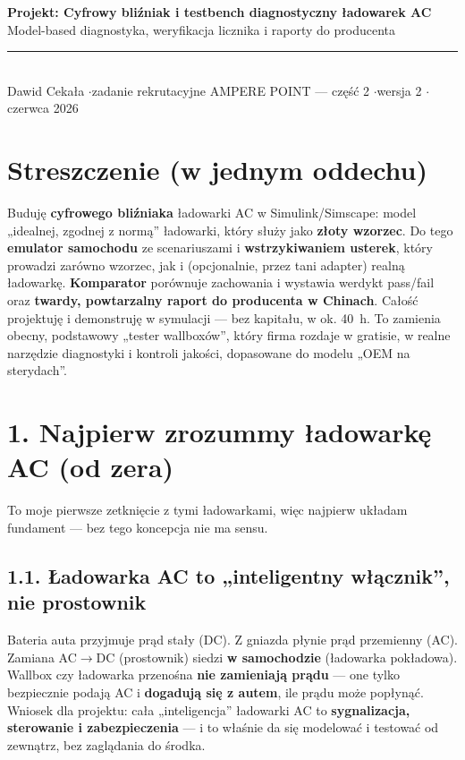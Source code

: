 \documentclass[11pt]{article}
\newcommand{\ra}{$\rightarrow$}
\newcommand{\key}[1]{\textbf{\color{navy}#1}}
\begin{document}
{\sffamily\bfseries\color{navy}\LARGE Projekt: Cyfrowy bliźniak i testbench diagnostyczny ładowarek AC}\\[3pt]
{\sffamily\large\color{navy} Model-based diagnostyka, weryfikacja licznika i raporty do producenta}\\[5pt]
{\color{rulegrey}\rule{\linewidth}{1pt}}\\[3pt]
{\sffamily\small Dawid Cekała \quad$\cdot$\quad zadanie rekrutacyjne AMPERE POINT --- część 2 \quad$\cdot$\quad wersja 2 \quad$\cdot$ czerwca 2026}

\vspace{0.7em}

\section{Streszczenie (w jednym oddechu)}

Buduję \key{cyfrowego bliźniaka} ładowarki AC w Simulink/Simscape: model „idealnej, zgodnej z normą'' ładowarki, który służy jako \key{złoty wzorzec}. Do tego \key{emulator samochodu} ze scenariuszami i \key{wstrzykiwaniem usterek}, który prowadzi zarówno wzorzec, jak i (opcjonalnie, przez tani adapter) realną ładowarkę. \key{Komparator} porównuje zachowania i wystawia werdykt pass/fail oraz \key{twardy, powtarzalny raport do producenta w Chinach}. Całość projektuję i demonstruję w symulacji --- bez kapitału, w ok. 40~h. To zamienia obecny, podstawowy „tester wallboxów'', który firma rozdaje w gratisie, w realne narzędzie diagnostyki i kontroli jakości, dopasowane do modelu „OEM na sterydach''.

\section{1. Najpierw zrozummy ładowarkę AC (od zera)}

To moje pierwsze zetknięcie z tymi ładowarkami, więc najpierw układam fundament --- bez tego koncepcja nie ma sensu.

\subsection{1.1. Ładowarka AC to „inteligentny włącznik'', nie prostownik}

Bateria auta przyjmuje prąd stały (DC). Z gniazda płynie prąd przemienny (AC). Zamiana AC\ra{}DC (prostownik) siedzi \key{w samochodzie} (ładowarka pokładowa). Wallbox czy ładowarka przenośna \key{nie zamieniają prądu} --- one tylko bezpiecznie podają AC i \key{dogadują się z autem}, ile prądu może popłynąć. Wniosek dla projektu: cała „inteligencja'' ładowarki AC to \key{sygnalizacja, sterowanie i zabezpieczenia} --- i to właśnie da się modelować i testować od zewnątrz, bez zaglądania do środka.
\end{document}
